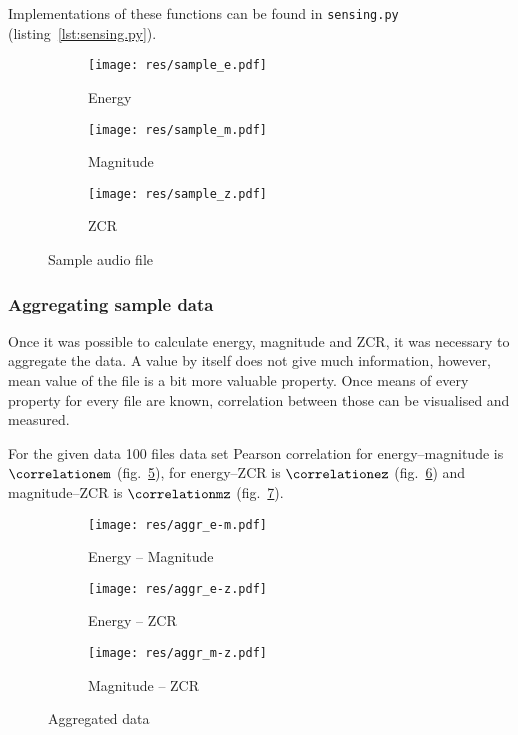\documentclass[english,11pt]{article}
\numberwithin{equation}{section}
\begin{document}
Implementations of these functions can be found in \texttt{sensing.py}
(listing~\ref{lst:sensing.py}).

\begin{figure}
    \centering
    \begin{subfigure}[b]{0.6\textwidth}
        \texttt{[image: res/sample\_e.pdf]}
        \caption{Energy}
        \label{fig:sample_e}
    \end{subfigure}

    \begin{subfigure}[b]{0.6\textwidth}
        \texttt{[image: res/sample\_m.pdf]}
        \caption{Magnitude}
        \label{fig:sample_m}
    \end{subfigure}

    \begin{subfigure}[b]{0.6\textwidth}
        \texttt{[image: res/sample\_z.pdf]}
        \caption{ZCR}
        \label{fig:sample_z}
    \end{subfigure}
    \caption{Sample audio file}\label{fig:sample}
\end{figure}

\subsubsection{Aggregating sample data}
\label{sec:aggregating}

Once it was possible to calculate energy, magnitude and ZCR, it was necessary
to aggregate the data. A value by itself does not give much information,
however, mean value of the file is a bit more valuable property. Once means of
every property for every file are known, correlation between those can be
visualised and measured.

For the given data 100 files data set Pearson correlation for energy--magnitude
is $\correlationem$ (fig.~\ref{fig:aggr_e-m}), for energy--ZCR is
$\correlationez$ (fig.~\ref{fig:aggr_e-z}) and magnitude--ZCR is
$\correlationmz$ (fig.~\ref{fig:aggr_m-z}).

\begin{figure}
    \centering
    \begin{subfigure}[b]{0.6\textwidth}
        \texttt{[image: res/aggr\_e-m.pdf]}
        \caption{Energy -- Magnitude}
        \label{fig:aggr_e-m}
    \end{subfigure}

    \begin{subfigure}[b]{0.6\textwidth}
        \texttt{[image: res/aggr\_e-z.pdf]}
        \caption{Energy -- ZCR}
        \label{fig:aggr_e-z}
    \end{subfigure}

    \begin{subfigure}[b]{0.6\textwidth}
        \texttt{[image: res/aggr\_m-z.pdf]}
        \caption{Magnitude -- ZCR}
        \label{fig:aggr_m-z}
    \end{subfigure}
    \caption{Aggregated data}\label{fig:aggr}
\end{figure}
\end{document}
